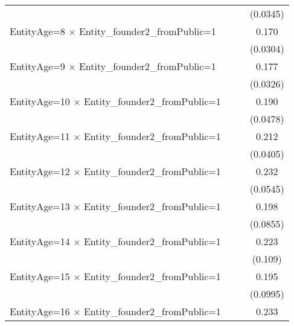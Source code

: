 {\begin{tabular}{l*{3}{c}}
                    &                     &                     &    (0.0345)         \\
[1em]
EntityAge=8 $\times$ Entity\_founder2\_fromPublic=1&                     &                     &       0.170\sym{***}\\
                    &                     &                     &    (0.0304)         \\
[1em]
EntityAge=9 $\times$ Entity\_founder2\_fromPublic=1&                     &                     &       0.177\sym{***}\\
                    &                     &                     &    (0.0326)         \\
[1em]
EntityAge=10 $\times$ Entity\_founder2\_fromPublic=1&                     &                     &       0.190\sym{***}\\
                    &                     &                     &    (0.0478)         \\
[1em]
EntityAge=11 $\times$ Entity\_founder2\_fromPublic=1&                     &                     &       0.212\sym{***}\\
                    &                     &                     &    (0.0405)         \\
[1em]
EntityAge=12 $\times$ Entity\_founder2\_fromPublic=1&                     &                     &       0.232\sym{***}\\
                    &                     &                     &    (0.0545)         \\
[1em]
EntityAge=13 $\times$ Entity\_founder2\_fromPublic=1&                     &                     &       0.198\sym{*}  \\
                    &                     &                     &    (0.0855)         \\
[1em]
EntityAge=14 $\times$ Entity\_founder2\_fromPublic=1&                     &                     &       0.223\sym{*}  \\
                    &                     &                     &     (0.109)         \\
[1em]
EntityAge=15 $\times$ Entity\_founder2\_fromPublic=1&                     &                     &       0.195         \\
                    &                     &                     &    (0.0995)         \\
[1em]
EntityAge=16 $\times$ Entity\_founder2\_fromPublic=1&                     &                     &       0.233         \\

\end{tabular}}
